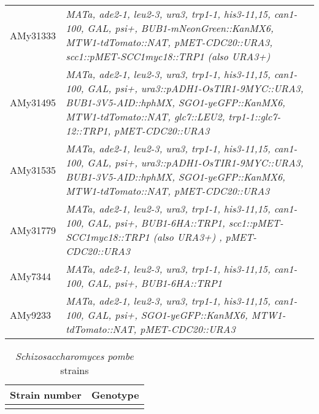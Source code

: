 \begin{table}[htb]
\begin{tabular}{p{}p{}}
AMy31333      & \textit{MATa, ade2-1, leu2-3, ura3, trp1-1, his3-11,15, can1-100, GAL,   psi+, BUB1-mNeonGreen::KanMX6, MTW1-tdTomato::NAT, pMET-CDC20::URA3,   scc1::pMET-SCC1myc18::TRP1 (also URA3+)}                                             \\
AMy31495      & \textit{MATa, ade2-1, leu2-3, ura3,   trp1-1, his3-11,15, can1-100, GAL, psi+, ura3::pADH1-OsTIR1-9MYC::URA3,   BUB1-3V5-AID::hphMX, SGO1-yeGFP::KanMX6, MTW1-tdTomato::NAT, glc7::LEU2,   trp1-1::glc7-12::TRP1, pMET-CDC20::URA3} \\
AMy31535      & \textit{MATa, ade2-1, leu2-3, ura3, trp1-1, his3-11,15, can1-100, GAL,   psi+, ura3::pADH1-OsTIR1-9MYC::URA3, BUB1-3V5-AID::hphMX, SGO1-yeGFP::KanMX6,   MTW1-tdTomato::NAT, pMET-CDC20::URA3}                                       \\
AMy31779      & \textit{MATa, ade2-1, leu2-3, ura3, trp1-1, his3-11,15, can1-100, GAL,   psi+, BUB1-6HA::TRP1, scc1::pMET-SCC1myc18::TRP1 (also URA3+) ,   pMET-CDC20::URA3}                                                                         \\
AMy7344       & \textit{MATa, ade2-1, leu2-3, ura3, trp1-1, his3-11,15, can1-100, GAL,   psi+, BUB1-6HA::TRP1}                                                                                                                                       \\
AMy9233       & \textit{MATa, ade2-1, leu2-3, ura3, trp1-1, his3-11,15, can1-100, GAL,   psi+, SGO1-yeGFP::KanMX6, MTW1-tdTomato::NAT, pMET-CDC20::URA3} 
\\
\hline                                                             

\end{tabular}
\end{table}

\begin{table}[htb]
\centering
\renewcommand{\arraystretch}{1.5}
\caption{\textit{Schizosaccharomyces pombe} strains}
\label{tab:pombetable}
\begin{tabular}{p{}p{}}
\hline
\textbf{Strain number} & \textbf{Genotype}
\\
\hline

\\
\hline                                                             

\end{tabular}
\end{table}

